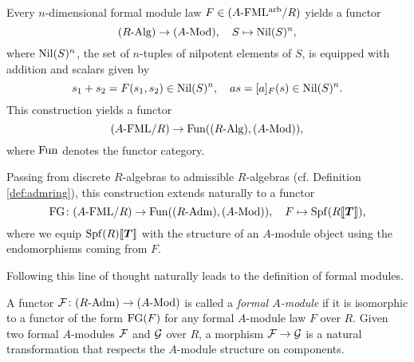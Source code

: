 \documentclass[../main.tex]{subfiles}
\begin{document}
Every $n$-dimensional formal module law $F \in {({A}\textnormal-\allowbreak\mathrm{FML^{arb}}/{R})}$
yields a functor
\begin{equation}\label{eq:fmnilpfunc}
  {({R}\textnormal-\allowbreak\mathrm{Alg})} \to {({A}\textnormal-\allowbreak\mathrm{Mod})}, \quad S \mapsto {\operatorname{Nil}}(S)^n,
\end{equation}
where ${\operatorname{Nil}}(S)^n$, the set of $n$-tuples of nilpotent elements of $S$, is
equipped with addition and scalars given by 
\begin{equation*}
  s_1 + s_2 = F(s_1, s_2) \in {\operatorname{Nil}}(S)^n, \quad a s = [a]_F(s) \in {\operatorname{Nil}}(S)^n.
\end{equation*}
This construction yields a functor 
\begin{equation}\label{eq:formfunc}
  {({A}\textnormal-\allowbreak\mathrm{FML}/{R})} \to \operatorname{Fun}({({R}\textnormal-\allowbreak\mathrm{Alg})}, {({A}\textnormal-\allowbreak\mathrm{Mod})}),
\end{equation}
where $\operatorname{Fun}$ denotes the functor category.

Passing from discrete $R$-algebras to admissible $R$-algebras (cf. Definition
\ref{def:admring}), this construction extends naturally to a functor 
\begin{equation*}
  \textnormal{FG} \colon {({A}\textnormal-\allowbreak\mathrm{FML}/{R})} \to \operatorname{Fun} ({({R}\textnormal-\allowbreak\mathrm{Adm})}, {({A}\textnormal-\allowbreak\mathrm{Mod})}), \quad F \mapsto \operatorname{Spf} (R\llbracket \boldsymbol{T} \rrbracket),
\end{equation*}
where we equip $\operatorname{Spf}(R) \llbracket \boldsymbol{T} \rrbracket$ with the structure of an $A$-module object
using the endomorphisms coming from $F$. 

Following this line of thought naturally leads to the definition of
formal modules. 

\begin{defi}
  A functor $\mathcal{F} \colon {({R}\textnormal-\allowbreak\mathrm{Adm})} \to {({A}\textnormal-\allowbreak\mathrm{Mod})}$ is called a \emph{formal $A$-module} if it  is isomorphic to a functor of the form $\textnormal{FG}(F)$ for
  any formal $A$-module law $F$ over $R$. Given two formal $A$-modules $\mathcal{F}$ and $\mathcal{G}$ over $R$, a
  morphism $\mathcal{F} \to \mathcal{G}$ is a natural transformation that respects the $A$-module structure on components.
\end{defi}

\end{document}
